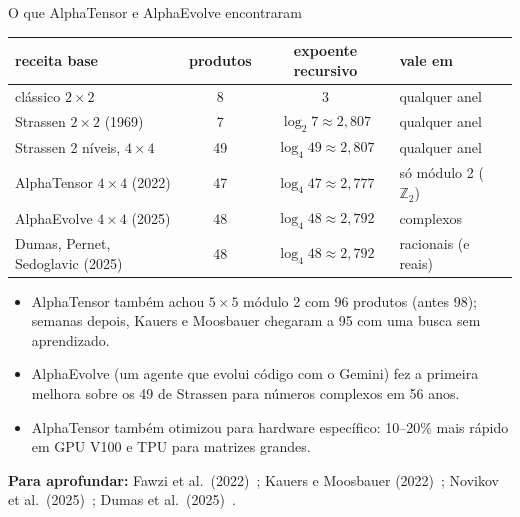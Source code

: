 \documentclass[aspectratio=169,xcolor=table]{beamer}
\newcommand{\fonte}[1]{%
  \vfill
  {\tiny\color{gray!55!black}\textbf{Para aprofundar:} #1\par}%
}
\begin{document}
\begin{frame}{O que AlphaTensor e AlphaEvolve encontraram}
  \centering\scriptsize
  \begin{tabular}{lccll}
    \toprule
    receita base & produtos & expoente recursivo & vale em & \\
    \midrule
    clássico $2\times2$             & 8  & $3$                     & qualquer anel & \\
    Strassen $2\times2$ (1969)      & 7  & $\log_2 7\approx 2{,}807$ & qualquer anel & \\
    Strassen 2 níveis, $4\times4$   & 49 & $\log_4 49\approx 2{,}807$ & qualquer anel & \\
    \rowcolor{green!10}
    AlphaTensor $4\times4$ (2022)   & 47 & $\log_4 47\approx 2{,}777$ & só módulo 2 ($\mathbb Z_2$) & \\
    \rowcolor{green!10}
    AlphaEvolve $4\times4$ (2025)   & 48 & $\log_4 48\approx 2{,}792$ & complexos & \\
    Dumas, Pernet, Sedoglavic (2025)& 48 & $\log_4 48\approx 2{,}792$ & racionais (e reais) & \\
    \bottomrule
  \end{tabular}
  \medskip

  \begin{itemize}\scriptsize
    \item AlphaTensor também achou $5\times5$ módulo 2 com 96 produtos (antes 98); semanas
          depois, Kauers e Moosbauer chegaram a 95 com uma busca sem aprendizado.
    \item AlphaEvolve (um agente que evolui código com o Gemini) fez a primeira melhora
          sobre os 49 de Strassen para números complexos em 56 anos.
    \item AlphaTensor também otimizou para hardware específico: 10--20\% mais rápido em
          GPU V100 e TPU para matrizes grandes.
  \end{itemize}
  \fonte{Fawzi et al.\ (2022)~\cite{fawzi2022discovering}; Kauers e Moosbauer (2022)~\cite{kauers2022flip};
    Novikov et al.\ (2025)~\cite{novikov2025alphaevolve}; Dumas et al.\ (2025)~\cite{dumas2025noncommutative}.}
\end{frame}
\end{document}
